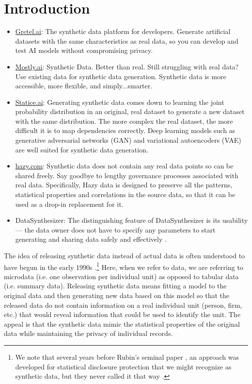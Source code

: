 \documentclass[runningheads]{llncs}
\begin{document}
\clearpage
\section{Introduction}

\begin{itemize}
    \item \url{Gretel.ai}: The synthetic data platform for developers. Generate artificial datasets with the same characteristics as real data, so you can develop and test AI models without compromising privacy.
    \item \url{Mostly.ai}: Synthetic Data. Better than real. Still struggling with real data? Use existing data for synthetic data generation. Synthetic data is more accessible, more flexible, and simply...smarter.
    \item \url{Statice.ai}: Generating synthetic data comes down to learning the joint probability distribution in an original, real dataset to generate a new dataset with the same distribution.  The more complex the real dataset, the more difficult it is to map dependencies correctly. Deep learning models such as generative adversarial networks (GAN) and variational autoencoders (VAE) are well suited for synthetic data generation.
    \item \url{hazy.com}: Synthetic data does not contain any real data points so can be shared freely. Say goodbye to lengthy governance processes associated with real data.  Specifically, Hazy data is designed to preserve all the patterns, statistical properties and correlations in the source data, so that it can be used as a drop-in replacement for it.
    \item DataSynthesizer: The distinguishing feature of DataSynthesizer is its usability — the data owner does not have to specify any parameters to start generating and sharing data safely and effectively  \cite{ping2017datasynthesizer}.
\end{itemize}


The idea of releasing synthetic data instead of actual data is often understood to have begun in the early 1990s \cite{rubin1993statistical,little1993statistical}.\footnote{We note that several years before Rubin's seminal paper \cite{rubin1993statistical}, an approach was developed for statistical disclosure protection that we might recognize as synthetic data, but they never called it that way \cite{liew1985data}.}  Here, when we refer to data, we are referring to microdata (i.e. one observation per individual unit) as opposed to tabular data (i.e. summary data).  Releasing synthetic data means fitting a model to the original data and then generating new data based on this model so that the released data do not contain information on a real individual unit (person, firm, etc.) that would reveal information that could be used to identify the unit.  The appeal is that the synthetic data mimic the statistical properties of the original data while maintaining the privacy of individual records.
\end{document}
